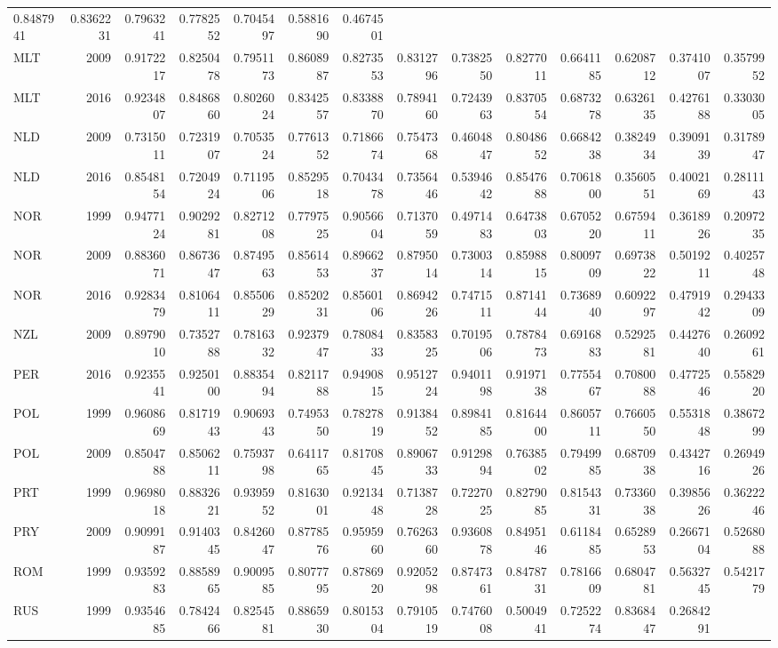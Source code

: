 \documentclass[]{article}
\begin{document}
\begin{longtable}[]{@{}lrrrrrrrrrrrrr@{}}
0.8487941 & 0.8362231 & 0.7963241 & 0.7782552 & 0.7045497 & 0.5881690 &
0.4674501\tabularnewline
MLT & 2009 & 0.9172217 & 0.8250478 & 0.7951173 & 0.8608987 & 0.8273553 &
0.8312796 & 0.7382550 & 0.8277011 & 0.6641185 & 0.6208712 & 0.3741007 &
0.3579952\tabularnewline
MLT & 2016 & 0.9234807 & 0.8486860 & 0.8026024 & 0.8342557 & 0.8338870 &
0.7894160 & 0.7243963 & 0.8370554 & 0.6873278 & 0.6326135 & 0.4276188 &
0.3303005\tabularnewline
NLD & 2009 & 0.7315011 & 0.7231907 & 0.7053524 & 0.7761352 & 0.7186674 &
0.7547368 & 0.4604847 & 0.8048652 & 0.6684238 & 0.3824934 & 0.3909139 &
0.3178947\tabularnewline
NLD & 2016 & 0.8548154 & 0.7204924 & 0.7119506 & 0.8529518 & 0.7043478 &
0.7356446 & 0.5394642 & 0.8547688 & 0.7061800 & 0.3560551 & 0.4002169 &
0.2811143\tabularnewline
NOR & 1999 & 0.9477124 & 0.9029281 & 0.8271208 & 0.7797525 & 0.9056604 &
0.7137059 & 0.4971483 & 0.6473803 & 0.6705220 & 0.6759411 & 0.3618926 &
0.2097235\tabularnewline
NOR & 2009 & 0.8836071 & 0.8673647 & 0.8749563 & 0.8561453 & 0.8966237 &
0.8795014 & 0.7300314 & 0.8598815 & 0.8009709 & 0.6973822 & 0.5019211 &
0.4025748\tabularnewline
NOR & 2016 & 0.9283479 & 0.8106411 & 0.8550629 & 0.8520231 & 0.8560106 &
0.8694226 & 0.7471511 & 0.8714144 & 0.7368940 & 0.6092297 & 0.4791942 &
0.2943309\tabularnewline
NZL & 2009 & 0.8979010 & 0.7352788 & 0.7816332 & 0.9237947 & 0.7808433 &
0.8358325 & 0.7019506 & 0.7878473 & 0.6916883 & 0.5292581 & 0.4427640 &
0.2609261\tabularnewline
PER & 2016 & 0.9235541 & 0.9250100 & 0.8835494 & 0.8211788 & 0.9490815 &
0.9512724 & 0.9401198 & 0.9197138 & 0.7755467 & 0.7080088 & 0.4772546 &
0.5582920\tabularnewline
POL & 1999 & 0.9608669 & 0.8171943 & 0.9069343 & 0.7495350 & 0.7827819 &
0.9138452 & 0.8984185 & 0.8164400 & 0.8605711 & 0.7660550 & 0.5531848 &
0.3867299\tabularnewline
POL & 2009 & 0.8504788 & 0.8506211 & 0.7593798 & 0.6411765 & 0.8170845 &
0.8906733 & 0.9129894 & 0.7638502 & 0.7949985 & 0.6870938 & 0.4342716 &
0.2694926\tabularnewline
PRT & 1999 & 0.9698018 & 0.8832621 & 0.9395952 & 0.8163001 & 0.9213448 &
0.7138728 & 0.7227025 & 0.8279085 & 0.8154331 & 0.7336038 & 0.3985626 &
0.3622246\tabularnewline
PRY & 2009 & 0.9099187 & 0.9140345 & 0.8426047 & 0.8778576 & 0.9595960 &
0.7626360 & 0.9360878 & 0.8495146 & 0.6118485 & 0.6528953 & 0.2667104 &
0.5268088\tabularnewline
ROM & 1999 & 0.9359283 & 0.8858965 & 0.9009585 & 0.8077795 & 0.8786920 &
0.9205298 & 0.8747361 & 0.8478731 & 0.7816609 & 0.6804781 & 0.5632745 &
0.5421779\tabularnewline
RUS & 1999 & 0.9354685 & 0.7842466 & 0.8254581 & 0.8865930 & 0.8015304 &
0.7910519 & 0.7476008 & 0.5004941 & 0.7252274 & 0.8368447 & 0.2684291 &

\end{longtable}
\end{document}

